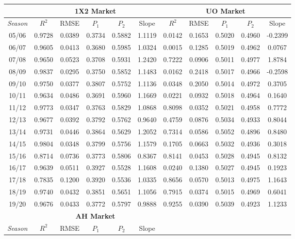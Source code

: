 \documentclass[a4paper,10pt]{report}
\begin{document}
\pagebreak

\begin{table}[h!]\begin{center}\begin{tabular}{c||ccccc||ccccc}
	&\multicolumn{5}{|c||}{\textbf{1X2 Market}} & \multicolumn{5}{|c}{\textbf{UO Market}} \\\hline
	\textit{Season} & $R^2$ & RMSE & $P_1$ & $P_2$ & Slope & $R^2$ & RMSE & $P_1$ & $P_2$ & Slope \\ \hline
	05/06 &0.9728 &0.0389 &0.3734 &0.5882 &1.1119 &0.0142 &0.1653 &0.5020 &0.4960 &-0.2399\\
	06/07 &0.9605 &0.0413 &0.3680 &0.5985 &1.0324 &0.0015 &0.1285 &0.5019 &0.4962 & 0.0767\\
	07/08 &0.9650 &0.0523 &0.3708 &0.5931 &1.2420 &0.7222 &0.0906 &0.5011 &0.4977 & 1.8784\\
	08/09 &0.9837 &0.0295 &0.3750 &0.5852 &1.1483 &0.0162 &0.2418 &0.5017 &0.4966 &-0.2598\\
	09/10 &0.9750 &0.0377 &0.3807 &0.5752 &1.1136 &0.0348 &0.2050 &0.5014 &0.4972 & 0.3705\\
	10/11 &0.9634 &0.0486 &0.3691 &0.5960 &1.1669 &0.0221 &0.0932 &0.5018 &0.4964 & 0.1640\\
	11/12 &0.9773 &0.0347 &0.3763 &0.5829 &1.0868 &0.8098 &0.0352 &0.5021 &0.4958 & 0.7772\\
	12/13 &0.9677 &0.0392 &0.3792 &0.5762 &0.9640 &0.4759 &0.0876 &0.5034 &0.4933 & 0.8044\\
	13/14 &0.9731 &0.0446 &0.3864 &0.5629 &1.2052 &0.7314 &0.0586 &0.5052 &0.4896 & 0.8480\\
	14/15 &0.9804 &0.0348 &0.3799 &0.5756 &1.1579 &0.1705 &0.0663 &0.5032 &0.4936 & 0.3018\\
	15/16 &0.8714 &0.0736 &0.3773 &0.5806 &0.8367 &0.8141 &0.0453 &0.5028 &0.4945 & 0.8132\\
	16/17 &0.9639 &0.0511 &0.3927 &0.5528 &1.1608 &0.0240 &0.1380 &0.5027 &0.4945 & 0.1923\\
	17/18 &0.7835 &0.1200 &0.3920 &0.5536 &1.0335 &0.8656 &0.0570 &0.5013 &0.4975 & 1.1643\\
	18/19 &0.9740 &0.0432 &0.3851 &0.5651 &1.1056 &0.7915 &0.0374 &0.5015 &0.4969 & 0.6041\\
	19/20 &0.9676 &0.0433 &0.3772 &0.5797 &0.9888 &0.9255 &0.0390 &0.5039 &0.4923 & 1.1233\\ \hline\hline
	&\multicolumn{5}{|c||}{\textbf{AH Market}} & \multicolumn{5}{|c}{ } \\\hline
	\textit{Season} & $R^2$ & RMSE & $P_1$ & $P_2$ & Slope & & & & & \\ \hline

\end{tabular}
\end{center}
\end{table}
\end{document}
